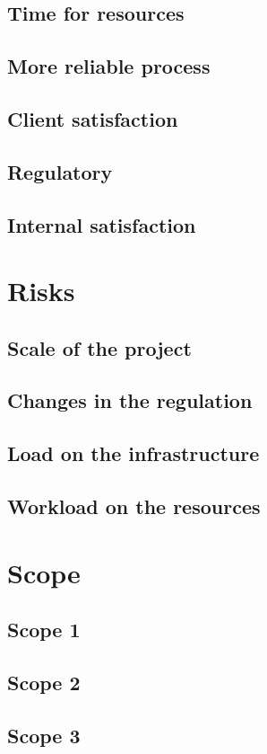 \documentclass[8pt]{article} %
\begin{document}
\subsection{Time for resources}
\subsection{More reliable process}
\subsection{Client satisfaction}
\subsection{Regulatory}
\subsection{Internal satisfaction}

\section{Risks}
\subsection{Scale of the project}
\subsection{Changes in the regulation}
\subsection{Load on the infrastructure}
\subsection{Workload on the resources}

\section{Scope}
\subsection{Scope 1}
\subsection{Scope 2}
\subsection{Scope 3}
\end{document}
